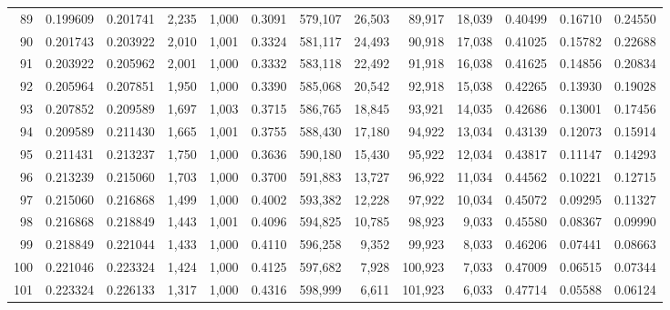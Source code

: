 \begin{tabular}{rrrrrrrrrrrrr}
89  &  0.199609 &  0.201741 &   2,235 &  1,000 &                                     0.3091 &  579,107 &   26,503 &   89,917 &   18,039 &  0.40499 &  0.16710 &  0.24550 \\
90  &  0.201743 &  0.203922 &   2,010 &  1,001 &                                     0.3324 &  581,117 &   24,493 &   90,918 &   17,038 &  0.41025 &  0.15782 &  0.22688 \\
91  &  0.203922 &  0.205962 &   2,001 &  1,000 &                                     0.3332 &  583,118 &   22,492 &   91,918 &   16,038 &  0.41625 &  0.14856 &  0.20834 \\
92  &  0.205964 &  0.207851 &   1,950 &  1,000 &                                     0.3390 &  585,068 &   20,542 &   92,918 &   15,038 &  0.42265 &  0.13930 &  0.19028 \\
93  &  0.207852 &  0.209589 &   1,697 &  1,003 &                                     0.3715 &  586,765 &   18,845 &   93,921 &   14,035 &  0.42686 &  0.13001 &  0.17456 \\
94  &  0.209589 &  0.211430 &   1,665 &  1,001 &                                     0.3755 &  588,430 &   17,180 &   94,922 &   13,034 &  0.43139 &  0.12073 &  0.15914 \\
95  &  0.211431 &  0.213237 &   1,750 &  1,000 &                                     0.3636 &  590,180 &   15,430 &   95,922 &   12,034 &  0.43817 &  0.11147 &  0.14293 \\
96  &  0.213239 &  0.215060 &   1,703 &  1,000 &                                     0.3700 &  591,883 &   13,727 &   96,922 &   11,034 &  0.44562 &  0.10221 &  0.12715 \\
97  &  0.215060 &  0.216868 &   1,499 &  1,000 &                                     0.4002 &  593,382 &   12,228 &   97,922 &   10,034 &  0.45072 &  0.09295 &  0.11327 \\
98  &  0.216868 &  0.218849 &   1,443 &  1,001 &                                     0.4096 &  594,825 &   10,785 &   98,923 &    9,033 &  0.45580 &  0.08367 &  0.09990 \\
99  &  0.218849 &  0.221044 &   1,433 &  1,000 &                                     0.4110 &  596,258 &    9,352 &   99,923 &    8,033 &  0.46206 &  0.07441 &  0.08663 \\
100 &  0.221046 &  0.223324 &   1,424 &  1,000 &                                     0.4125 &  597,682 &    7,928 &  100,923 &    7,033 &  0.47009 &  0.06515 &  0.07344 \\
101 &  0.223324 &  0.226133 &   1,317 &  1,000 &                                     0.4316 &  598,999 &    6,611 &  101,923 &    6,033 &  0.47714 &  0.05588 &  0.06124 \\

\end{tabular}

